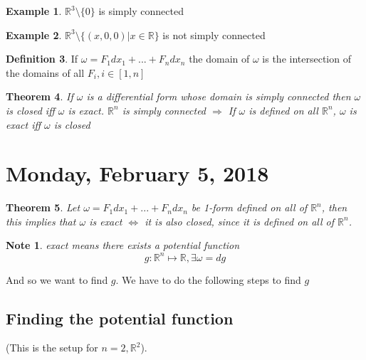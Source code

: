 \documentclass[12pt]{article}
\theoremstyle{plain}
\newtheorem*{note}{Note}
\newtheorem{theorem}{Theorem}[section]
\theoremstyle{definition}
\newtheorem{definition}[theorem]{Definition}
\newtheorem{example}[theorem]{Example}
\begin{document}
\begin{example}
  $\mathbb{R}^3 \setminus \{ 0 \}$ is simply connected
\end{example}

\begin{example}
  $\mathbb{R}^3 \setminus \{ (x,0,0) | x\in \mathbb{R} \}$ is not simply connected
\end{example}

\begin{definition}
  If $\omega = F_1 dx_1 + ... + F_n dx_n$ the domain of $\omega$ is the intersection of the domains of all $F_i, i\in [1,n]$
\end{definition}

\begin{theorem}
  If $\omega$ is a differential form whose domain is simply connected then $\omega$ is closed iff $\omega$ is exact. $\mathbb{R}^n$ is simply connected $\Longrightarrow$ If $\omega$ is defined on all $\mathbb{R}^n$, $\omega$ is exact iff $\omega$ is closed
\end{theorem}

\newpage

\section{Monday, February 5, 2018}

\begin{theorem}
	Let $\omega = F_1 dx_1 + ... + F_n dx_n$ be 1-form defined on all of $\mathbb{R}^n$, then this implies that $\omega$ is exact $\Longleftrightarrow$ it is also closed, since it is defined on all of $\mathbb{R}^n$.
\end{theorem}

\begin{note}
	exact means there exists a potential function $$g:\mathbb{R}^n \mapsto \mathbb{R}, \exists \omega = dg$$
\end{note}

And so we want to find $g$. We have to do the following steps to find $g$

\subsection{Finding the potential function}

(This is the setup for $n=2, \mathbb{R}^2$).
\end{document}
